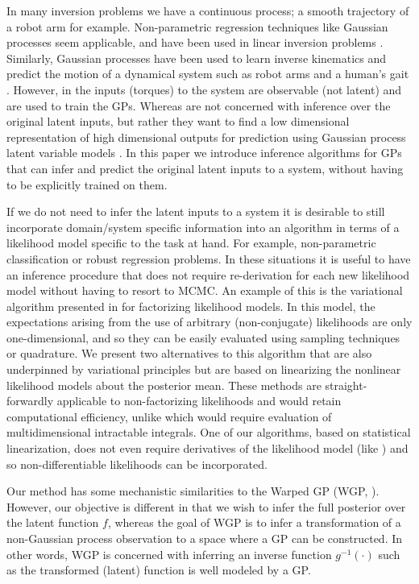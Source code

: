 \documentclass{article} %
\begin{document}
In many inversion problems we have a continuous process; a smooth trajectory of
a robot arm for example. Non-parametric regression techniques like Gaussian
processes \cite{Rasmussen2006} seem applicable, and have been used in linear
inversion problems \cite{Reid2013}. Similarly, Gaussian processes have been
used to learn inverse kinematics and predict the motion of a dynamical system
such as robot arms \cite{Rasmussen2006, Williams2008} and a human's gait
\cite{Lawrence2003, Wang2005, Wang2008}.  However, in \cite{Rasmussen2006,
    Williams2008} the inputs (torques) to the system are observable (not
latent) and are used to train the GPs. Whereas \cite{Wang2005, Wang2008} are
not concerned with inference over the original latent inputs, but rather they
want to find a low dimensional representation of high dimensional outputs for
prediction using Gaussian process latent variable models \cite{Lawrence2003}.
In this paper we introduce inference algorithms for GPs that can infer and
predict the original latent inputs to a system, without having to be explicitly
trained on them.

If we do not need to infer the latent inputs to a system it is desirable to
still incorporate domain/system specific information into an algorithm in terms
of a likelihood model specific to the task at hand. For example, non-parametric
classification or robust regression problems. In these situations it is useful
to have an inference procedure that does not require re-derivation for each new
likelihood model without having to resort to MCMC. An example of this is the
variational algorithm presented in \cite{Opper2009} for factorizing likelihood
models. In this model, the expectations arising from the use of arbitrary
(non-conjugate) likelihoods are only one-dimensional, and so they can be easily
evaluated using sampling techniques or quadrature. 
%
We present two alternatives to this algorithm that are also underpinned by
variational principles but  are based on linearizing the nonlinear likelihood
models about the posterior mean. These methods are straight-forwardly
applicable to non-factorizing likelihoods and would retain computational
efficiency, unlike \cite{Opper2009} which would require evaluation of
multidimensional intractable integrals. One of our algorithms, based on
statistical linearization, does not even require derivatives of the likelihood
model (like \cite{Opper2009}) and so non-differentiable likelihoods can be
incorporated.

Our method has some mechanistic similarities to the 
Warped GP (WGP, \cite{snelson2003warped}). However, our objective is different 
in that we wish to infer the full posterior over the latent function $f$, whereas 
the goal of  WGP is to infer a transformation of a non-Gaussian 
process observation to a space where a GP can be constructed. In other 
words, WGP is concerned with inferring an inverse function $g^{-1}(\cdot)$
such as the transformed (latent) function is well modeled by a GP.
\end{document}
